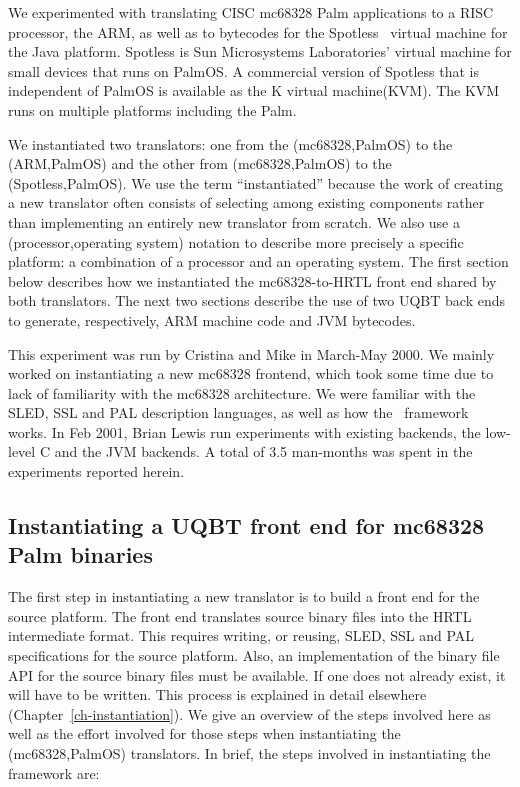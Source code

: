 We experimented with translating CISC mc68328 Palm applications to a 
RISC processor, the ARM, as well as to bytecodes for the
Spotless~\cite{Taiv99} virtual machine for the Java platform.
Spotless is Sun Microsystems Laboratories' virtual machine for small 
devices that runs on PalmOS.
A commercial version of Spotless that is independent of PalmOS
is available as the K virtual machine\TM (KVM\TM).
The KVM runs on multiple platforms including the Palm.

We instantiated two translators:
one from the (mc68328,PalmOS) to the (ARM,PalmOS) 
and the other from (mc68328,PalmOS) to the (Spotless,PalmOS).
We use the term ``instantiated''
because the work of creating a new translator
often consists of selecting among existing components
rather than implementing an entirely new translator from scratch.
We also use a (processor,operating system) notation
to describe more precisely a specific platform:
a combination of a processor and an operating system.
The first section below describes how we instantiated the
mc68328-to-HRTL front end shared by both translators.
The next two sections describe the use of two UQBT back ends
to generate, respectively, ARM machine code and JVM bytecodes.

This experiment was run by Cristina and Mike in March-May 2000. 
We mainly worked on instantiating a new mc68328 frontend, which 
took some time due to lack of familiarity with the mc68328 
architecture.  We were familiar with the SLED, SSL and PAL 
description languages, as well as how the \uqbt\ framework works. 
In Feb 2001, Brian Lewis run experiments with existing backends, 
the low-level C and the JVM backends.  
A total of 3.5 man-months was spent in the experiments reported 
herein. 


\subsection{Instantiating a UQBT front end for mc68328 Palm binaries}
The first step in instantiating a new translator
is to build a front end for the source platform.
The front end translates source binary files
into the HRTL intermediate format.
This requires writing, or reusing, SLED, SSL and PAL specifications
for the source platform.
Also, an implementation of the binary file API for the
source binary files must be available.
If one does not already exist, it will have to be written.
This process is explained in detail elsewhere (Chapter~\ref{ch-instantiation}).
We give an overview of the steps involved here
as well as the effort involved for those steps when
instantiating the (mc68328,PalmOS) translators.
In brief, the steps involved in instantiating the framework are:

